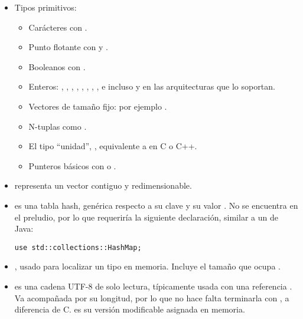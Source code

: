 \begin{itemize}
    \item Tipos primitivos:
        \begin{itemize}
            \item Carácteres con .

            \item Punto flotante con  y .

            \item Booleanos con .

            \item Enteros: , , , ,
                , , , , e incluso
                 y  en las arquitecturas que lo soportan.

            \item Vectores de tamaño fijo: por ejemplo \code{[1, 2, 3, 4, 5]}.

            \item N-tuplas como .

            \item El tipo ``unidad'', \code{()}, equivalente a  en C
                o C++.

            \item Punteros básicos con  o .

        \end{itemize}

    \item {} representa un vector contiguo y redimensionable.

    \item {} es una tabla hash, genérica respecto a su clave
         y su valor . No se encuentra en el preludio, por lo que
        requeriría la siguiente declaración, similar a un  de Java:

\begin{verbatim}
use std::collections::HashMap;
\end{verbatim}

    \item {}, usado para localizar un tipo  en memoria.
        Incluye el tamaño que ocupa .

    \item {} es una cadena UTF-8 de solo lectura, típicamente usada con
        una referencia . Va acompañada por su longitud, por lo que no
        hace falta terminarla con \code{\0}, a diferencia de C.  es
        su versión modificable asignada en memoria.

\end{itemize}

